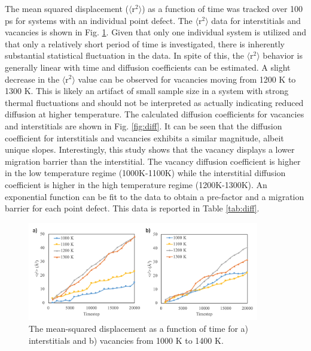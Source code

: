 \documentclass[review]{elsarticle}
\begin{document}
The mean squared displacement ($\langle$r$^2$$\rangle$) as a function of time was tracked over 100 ps for systems with an individual point defect. The $\langle$r$^2$$\rangle$ data for interstitials and vacancies is shown in Fig. \ref{fig:rsquare}. Given that only one individual system is utilized and that only a relatively short period of time is investigated, there is inherently substantial statistical fluctuation in the data. In spite of this, the $\langle$r$^2$$\rangle$ behavior is generally linear with time and diffusion coefficients can be estimated. A slight decrease in the $\langle$r$^2$$\rangle$ value can be observed for vacancies moving from 1200 K to 1300 K. This is likely an artifact of small sample size in a system with strong thermal fluctuations and should not be interpreted as actually indicating reduced diffusion at higher temperature. The calculated diffusion coefficients for vacancies and interstitials are shown in Fig. \ref{fig:diff}. It can be seen that the diffusion coefficient for interstitials and vacancies exhibits a similar magnitude, albeit unique slopes. Interestingly, this study shows that the vacancy displays a lower migration barrier than the interstitial. The vacancy diffusion coefficient is higher in the low temperature regime (1000K-1100K) while the interstitial diffusion coefficient is higher in the high temperature regime (1200K-1300K).  An exponential function can be fit to the data to obtain a pre-factor and a migration barrier for each point defect. This data is reported in Table \ref{tab:diff}. 

 \begin{figure}[h]
 \centering
 \includegraphics[width=0.9\textwidth]{msd.png} 
 \caption{The mean-squared displacement as a function of time for a) interstitials and b) vacancies from 1000 K to 1400 K.  }
 \label{fig:rsquare}
\end{figure}
\end{document}
